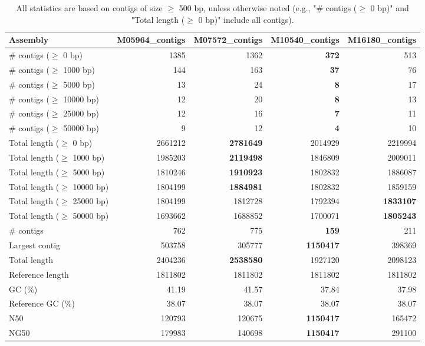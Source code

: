 \documentclass[12pt,a4paper]{article}
\begin{document}
\begin{table}[ht]
\begin{center}
\caption{All statistics are based on contigs of size $\geq$ 500 bp, unless otherwise noted (e.g., "\# contigs ($\geq$ 0 bp)" and "Total length ($\geq$ 0 bp)" include all contigs).}
\begin{tabular}{|l*{4}{|r}|}
\hline
Assembly & M05964\_contigs & M07572\_contigs & M10540\_contigs & M16180\_contigs \\ \hline
\# contigs ($\geq$ 0 bp) & 1385 & 1362 & {\bf 372} & 513 \\ \hline
\# contigs ($\geq$ 1000 bp) & 144 & 163 & {\bf 37} & 76 \\ \hline
\# contigs ($\geq$ 5000 bp) & 13 & 24 & {\bf 8} & 17 \\ \hline
\# contigs ($\geq$ 10000 bp) & 12 & 20 & {\bf 8} & 13 \\ \hline
\# contigs ($\geq$ 25000 bp) & 12 & 16 & {\bf 7} & 11 \\ \hline
\# contigs ($\geq$ 50000 bp) & 9 & 12 & {\bf 4} & 10 \\ \hline
Total length ($\geq$ 0 bp) & 2661212 & {\bf 2781649} & 2014929 & 2219994 \\ \hline
Total length ($\geq$ 1000 bp) & 1985203 & {\bf 2119498} & 1846809 & 2009011 \\ \hline
Total length ($\geq$ 5000 bp) & 1810246 & {\bf 1910923} & 1802832 & 1886087 \\ \hline
Total length ($\geq$ 10000 bp) & 1804199 & {\bf 1884981} & 1802832 & 1859159 \\ \hline
Total length ($\geq$ 25000 bp) & 1804199 & 1812728 & 1792394 & {\bf 1833107} \\ \hline
Total length ($\geq$ 50000 bp) & 1693662 & 1688852 & 1700071 & {\bf 1805243} \\ \hline
\# contigs & 762 & 775 & {\bf 159} & 211 \\ \hline
Largest contig & 503758 & 305777 & {\bf 1150417} & 398369 \\ \hline
Total length & 2404236 & {\bf 2538580} & 1927120 & 2098123 \\ \hline
Reference length & 1811802 & 1811802 & 1811802 & 1811802 \\ \hline
GC (\%) & 41.19 & 41.57 & 37.84 & 37.98 \\ \hline
Reference GC (\%) & 38.07 & 38.07 & 38.07 & 38.07 \\ \hline
N50 & 120793 & 120675 & {\bf 1150417} & 165472 \\ \hline
NG50 & 179983 & 140698 & {\bf 1150417} & 291100 \\ \hline

\end{tabular}
\end{center}
\end{table}
\end{document}
